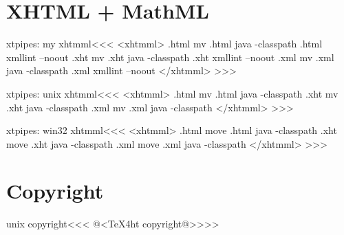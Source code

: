 \documentclass{article}
\begin{document}
\section{XHTML + MathML}

\<xtpipes: my xhtmml\><<<
<xhtmml>
.html mv %
.html java -classpath %
.html xmllint --noout %
.xht mv %
.xht java -classpath %
.xht xmllint --noout %
.xml mv %
.xml java -classpath %
.xml xmllint --noout %
</xhtmml>
>>>


\<xtpipes: unix xhtmml\><<<
<xhtmml>
.html mv %
.html java -classpath  %
.xht mv %
.xht java -classpath  %
.xml mv %
.xml java -classpath  %
</xhtmml>
>>>


\<xtpipes: win32 xhtmml\><<<
<xhtmml>
.html move %
.html java -classpath  %
.xht move %
.xht java -classpath  %
.xml move %
.xml java -classpath  %
</xhtmml>
>>>





\section{Copyright}




\<unix copyright\><<<
@<TeX4ht copyright@>>>>
\end{document}
